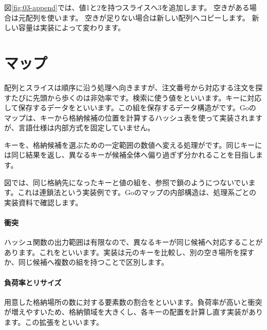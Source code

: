 \par
\endgroup
\par
\endgroup


図\ref{fig:03-append}では、値1と2を持つスライスへ3を追加します。
空きがある場合は元配列を使います。
空きが足りない場合は新しい配列へコピーします。
新しい容量は実装によって変わります。


\section{マップ}
\label{sec:03-runtime-data-16}

配列とスライスは順序に沿う処理へ向きますが、注文番号から対応する注文を探すたびに先頭から歩くのは非効率です。検索に使う値をといいます。キーに対応して保存するデータをといいます。この組を保存するデータ構造がです。Goのマップは、キーから格納候補の位置を計算するハッシュ表を使って実装されますが、言語仕様は内部方式を固定していません。

キーを、格納候補を選ぶための一定範囲の数値へ変える処理がです。同じキーには同じ結果を返し、異なるキーが候補全体へ偏り過ぎず分かれることを目指します。

\begingroup
\begingroup
      \centering
\par
\endgroup
\begingroup
図では、同じ格納先になったキーと値の組を、参照で鎖のようにつないでいます。これは連鎖法という実装例です。Goのマップの内部構造は、処理系ごとの実装資料で確認します。
      \vspace{2mm}
\paragraph{衝突}
        ハッシュ関数の出力範囲は有限なので、異なるキーが同じ候補へ対応することがあります。これをといいます。実装は元のキーを比較し、別の空き場所を探すか、同じ候補へ複数の組を持つことで区別します。

\par
\endgroup
\medskip
\begingroup
\paragraph{負荷率とリサイズ}
        用意した格納場所の数に対する要素数の割合をといいます。負荷率が高いと衝突が増えやすいため、格納領域を大きくし、各キーの配置を計算し直す実装があります。この拡張をといいます。

